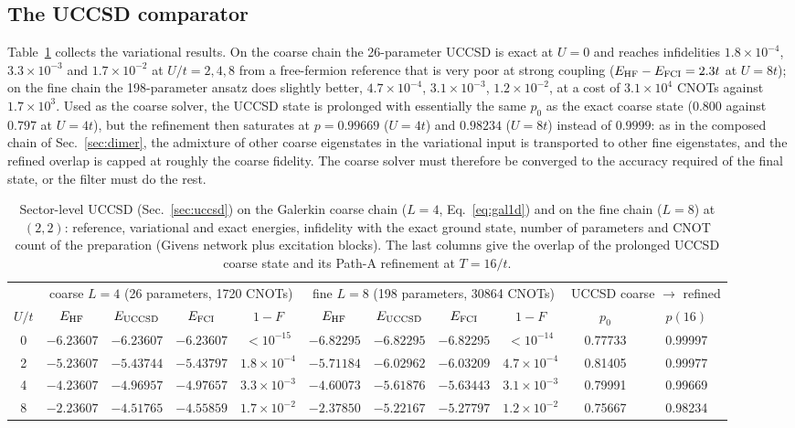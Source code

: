 \documentclass[
  aps,
  prc,
  reprint,
  superscriptaddress,
  floatfix,
  nofootinbib
]{revtex4-2}
\begin{document}
\subsection{The UCCSD comparator}
\label{sec:res-uccsd}
Table~\ref{tab:uccsd} collects the variational results.  On the coarse chain
the 26-parameter UCCSD is exact at $U=0$ and reaches infidelities
$1.8\times10^{-4}$, $3.3\times10^{-3}$ and $1.7\times10^{-2}$ at
$U/t=2,4,8$ from a free-fermion reference that is very poor at strong
coupling ($E_{\rm HF}-E_{\rm FCI}=2.3t$ at $U=8t$); on the fine chain the
198-parameter ansatz does slightly better, $4.7\times10^{-4}$,
$3.1\times10^{-3}$, $1.2\times10^{-2}$, at a cost of $3.1\times10^4$ CNOTs
against $1.7\times10^3$.  Used as the coarse solver, the UCCSD state is
prolonged with essentially the same $p_0$ as the exact coarse state
($0.800$ against $0.797$ at $U=4t$), but the refinement then saturates at
$p=0.99669$ ($U=4t$) and $0.98234$ ($U=8t$) instead of $0.9999$: as in the
composed chain of Sec.~\ref{sec:dimer}, the admixture of other coarse
eigenstates in the variational input is transported to other fine
eigenstates, and the refined overlap is capped at roughly the coarse
fidelity.  The coarse solver must therefore be converged to the accuracy
required of the final state, or the filter must do the rest.

\begin{table}[t]
  \caption{Sector-level UCCSD (Sec.~\ref{sec:uccsd}) on the Galerkin coarse
  chain ($L=4$, Eq.~\eqref{eq:gal1d}) and on the fine chain ($L=8$) at $(2,2)$:
  reference, variational and exact energies, infidelity with the exact ground
  state, number of parameters and CNOT count of the preparation (Givens
  network plus excitation blocks).  The last columns give the overlap of the
  prolonged UCCSD coarse state and its Path-A refinement at $T=16/t$.}
  \label{tab:uccsd}
  \begin{ruledtabular}
  \begin{tabular}{c|cccc|cccc|cc}
  & \multicolumn{4}{c|}{coarse $L=4$ (26 parameters, 1720 CNOTs)} & \multicolumn{4}{c|}{fine $L=8$ (198 parameters, 30864 CNOTs)} & \multicolumn{2}{c}{UCCSD coarse $\to$ refined}\\
  $U/t$ & $E_{\rm HF}$ & $E_{\rm UCCSD}$ & $E_{\rm FCI}$ & $1-F$ & $E_{\rm HF}$ & $E_{\rm UCCSD}$ & $E_{\rm FCI}$ & $1-F$ & $p_0$ & $p(16)$\\
  \hline
  0 & $-6.23607$ & $-6.23607$ & $-6.23607$ & $<10^{-15}$ & $-6.82295$ & $-6.82295$ & $-6.82295$ & $<10^{-14}$ & 0.77733 & 0.99997\\
  2 & $-5.23607$ & $-5.43744$ & $-5.43797$ & $1.8\times10^{-4}$ & $-5.71184$ & $-6.02962$ & $-6.03209$ & $4.7\times10^{-4}$ & 0.81405 & 0.99977\\
  4 & $-4.23607$ & $-4.96957$ & $-4.97657$ & $3.3\times10^{-3}$ & $-4.60073$ & $-5.61876$ & $-5.63443$ & $3.1\times10^{-3}$ & 0.79991 & 0.99669\\
  8 & $-2.23607$ & $-4.51765$ & $-4.55859$ & $1.7\times10^{-2}$ & $-2.37850$ & $-5.22167$ & $-5.27797$ & $1.2\times10^{-2}$ & 0.75667 & 0.98234\\
  \end{tabular}
  \end{ruledtabular}
\end{table}
\end{document}
